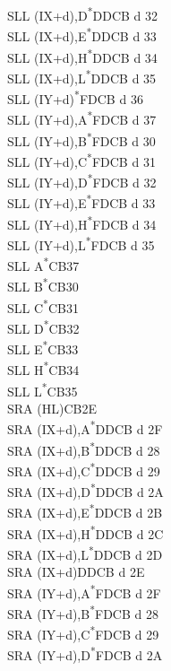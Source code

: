 \documentclass[twoside,openright,a4paper]{book}
\begin{document}
\begin{multicols}{3}
{\begin{tabbing}
	SLL (IX+d),D\textsuperscript{*}\>DDCB d 32\\
	SLL (IX+d),E\textsuperscript{*}\>DDCB d 33\\
	SLL (IX+d),H\textsuperscript{*}\>DDCB d 34\\
	SLL (IX+d),L\textsuperscript{*}\>DDCB d 35\\
	SLL (IY+d)\textsuperscript{*}\>FDCB d 36\\
	SLL (IY+d),A\textsuperscript{*}\>FDCB d 37\\
	SLL (IY+d),B\textsuperscript{*}\>FDCB d 30\\
	SLL (IY+d),C\textsuperscript{*}\>FDCB d 31\\
	SLL (IY+d),D\textsuperscript{*}\>FDCB d 32\\
	SLL (IY+d),E\textsuperscript{*}\>FDCB d 33\\
	SLL (IY+d),H\textsuperscript{*}\>FDCB d 34\\
	SLL (IY+d),L\textsuperscript{*}\>FDCB d 35\\
	SLL A\textsuperscript{*}\>CB37\\
	SLL B\textsuperscript{*}\>CB30\\
	SLL C\textsuperscript{*}\>CB31\\
	SLL D\textsuperscript{*}\>CB32\\
	SLL E\textsuperscript{*}\>CB33\\
	SLL H\textsuperscript{*}\>CB34\\
	SLL L\textsuperscript{*}\>CB35\\
	SRA (HL)\>CB2E\\
	SRA (IX+d),A\textsuperscript{*}\>DDCB d 2F\\
	SRA (IX+d),B\textsuperscript{*}\>DDCB d 28\\
	SRA (IX+d),C\textsuperscript{*}\>DDCB d 29\\
	SRA (IX+d),D\textsuperscript{*}\>DDCB d 2A\\
	SRA (IX+d),E\textsuperscript{*}\>DDCB d 2B\\
	SRA (IX+d),H\textsuperscript{*}\>DDCB d 2C\\
	SRA (IX+d),L\textsuperscript{*}\>DDCB d 2D\\
	SRA (IX+d)\>DDCB d 2E\\
	SRA (IY+d),A\textsuperscript{*}\>FDCB d 2F\\
	SRA (IY+d),B\textsuperscript{*}\>FDCB d 28\\
	SRA (IY+d),C\textsuperscript{*}\>FDCB d 29\\
	SRA (IY+d),D\textsuperscript{*}\>FDCB d 2A\\

\end{tabbing}}
\end{multicols}
\end{document}
